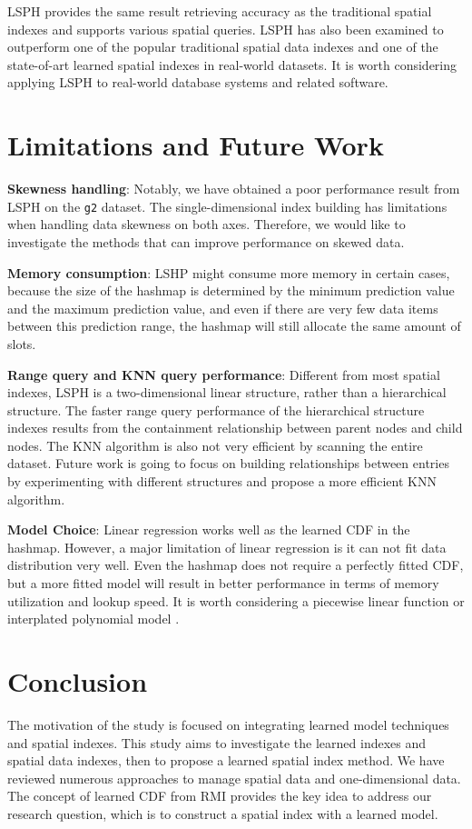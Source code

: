 LSPH provides the same result retrieving accuracy as the traditional spatial indexes and supports various spatial queries. LSPH has also been examined to outperform one of the popular traditional spatial data indexes and one of the state-of-art learned spatial indexes in real-world datasets. It is worth considering applying LSPH to real-world database systems and related software. 


\section{Limitations and Future Work}
\textbf{Skewness handling}: Notably, we have obtained a poor performance result from LSPH on the \texttt{g2} dataset. The single-dimensional index building has limitations when handling data skewness on both axes. Therefore, we would like to investigate the methods that can improve performance on skewed data. 

\textbf{Memory consumption}: LSHP might consume more memory in certain cases, because the size of the hashmap is determined by the minimum prediction value and the maximum prediction value, and even if there are very few data items between this prediction range, the hashmap will still allocate the same amount of slots. 

\textbf{Range query and KNN query performance}: Different from most spatial indexes, LSPH is a two-dimensional linear structure, rather than a hierarchical structure. The faster range query performance of the hierarchical structure indexes results from the containment relationship between parent nodes and child nodes. The KNN algorithm is also not very efficient by scanning the entire dataset. Future work is going to focus on building relationships between entries by experimenting with different structures and propose a more efficient KNN algorithm. 


\textbf{Model Choice}: Linear regression works well as the learned CDF in the hashmap. However, a major limitation of linear regression is it can not fit data distribution very well. Even the hashmap does not require a perfectly fitted CDF, but a more fitted model will result in better performance in terms of memory utilization and lookup speed. It is worth considering a piecewise linear function or interplated polynomial model \cite{setiawan2020function}.

\section{Conclusion}
The motivation of the study is focused on integrating learned model techniques and spatial indexes. This study aims to investigate the learned indexes and spatial data indexes, then to propose a learned spatial index method. We have reviewed numerous approaches to manage spatial data and one-dimensional data. The concept of learned CDF from RMI provides the key idea to address our research question, which is to construct a spatial index with a learned model. 

